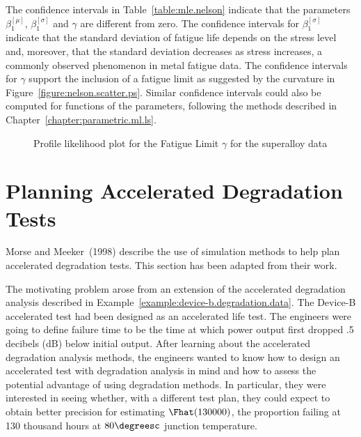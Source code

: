The confidence intervals in Table~\ref{table:mle.nelson} indicate that
the parameters $\beta^{[\mu]}_{1}$, $\beta^{[\sigma]}_{1}$ and
$\gamma$ are different from zero. The confidence intervals for
$\beta^{[\sigma]}_{1}$ indicate that the standard deviation of fatigue
life depends on the stress level and, moreover, that the standard
deviation decreases as stress increases, a commonly observed
phenomenon in metal fatigue data.  The confidence intervals for
$\gamma$ support the inclusion of a fatigue limit as suggested by the
curvature in Figure~\ref{figure:nelson.scatter.ps}. Similar confidence
intervals could also be computed for functions of the parameters, following
the methods described in Chapter~\ref{chapter:parametric.ml.ls}.

\begin{figure}
\caption{Profile likelihood plot for the Fatigue Limit $\gamma$ for the
superalloy data}
\label{figure:nelson.like.ps}
\end{figure}

\section{Planning Accelerated Degradation Tests}
\label{section:planning.accelerated.degradation.tests}

Morse and Meeker~(1998) describe the use of simulation methods to
help plan accelerated degradation tests.  This section has been
adapted from their work.

The motivating problem arose from an extension of the accelerated
degradation analysis described in
Example~\ref{example:device-b.degradation.data}.  The Device-B
accelerated test had been designed as an accelerated life test. The
engineers were going to define failure time to be the time at which
power output first dropped .5 decibels (dB) below initial output.
After learning about the accelerated degradation analysis methods,
the engineers wanted to know how to design an accelerated test with
degradation analysis in mind and how to assess the potential
advantage of using degradation methods. In particular, they were
interested in seeing whether, with a different test plan, they could
expect to obtain better precision for estimating $\Fhat(130000)$,
the proportion failing at 130 thousand hours at $80\degreesc$ junction
temperature.

